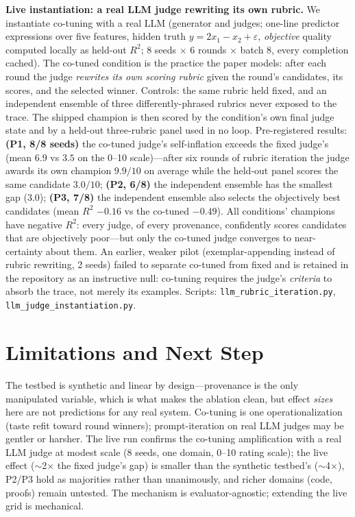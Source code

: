\documentclass[sigconf]{acmart}
\begin{document}
\textbf{Live instantiation: a real LLM judge rewriting its own rubric.} We instantiate co-tuning with a real LLM (generator and judges; one-line predictor expressions over five features, hidden truth $y=2x_1-x_2+\varepsilon$, \emph{objective} quality computed locally as held-out $R^2$; 8 seeds $\times$ 6 rounds $\times$ batch 8, every completion cached). The co-tuned condition is the practice the paper models: after each round the judge \emph{rewrites its own scoring rubric} given the round's candidates, its scores, and the selected winner. Controls: the same rubric held fixed, and an independent ensemble of three differently-phrased rubrics never exposed to the trace. The shipped champion is then scored by the condition's own final judge state and by a held-out three-rubric panel used in no loop. Pre-registered results: \textbf{(P1, 8/8 seeds)} the co-tuned judge's self-inflation exceeds the fixed judge's (mean $6.9$ vs $3.5$ on the 0--10 scale)---after six rounds of rubric iteration the judge awards its own champion $9.9/10$ on average while the held-out panel scores the same candidate $3.0/10$; \textbf{(P2, 6/8)} the independent ensemble has the smallest gap ($3.0$); \textbf{(P3, 7/8)} the independent ensemble also selects the objectively best candidates (mean $R^2$ $-0.16$ vs the co-tuned $-0.49$). All conditions' champions have negative $R^2$: every judge, of every provenance, confidently scores candidates that are objectively poor---but only the co-tuned judge converges to near-certainty about them. An earlier, weaker pilot (exemplar-appending instead of rubric rewriting, 2 seeds) failed to separate co-tuned from fixed and is retained in the repository as an instructive null: co-tuning requires the judge's \emph{criteria} to absorb the trace, not merely its examples. Scripts: \texttt{llm\_rubric\_iteration.py}, \texttt{llm\_judge\_instantiation.py}.

\section{Limitations and Next Step}
The testbed is synthetic and linear by design---provenance is the only manipulated variable, which is what makes the ablation clean, but effect \emph{sizes} here are not predictions for any real system. Co-tuning is one operationalization (taste refit toward round winners); prompt-iteration on real LLM judges may be gentler or harsher. The live run confirms the co-tuning amplification with a real LLM judge at modest scale (8 seeds, one domain, 0--10 rating scale); the live effect ($\sim$2$\times$ the fixed judge's gap) is smaller than the synthetic testbed's ($\sim$4$\times$), P2/P3 hold as majorities rather than unanimously, and richer domains (code, proofs) remain untested. The mechanism is evaluator-agnostic; extending the live grid is mechanical.
\end{document}
